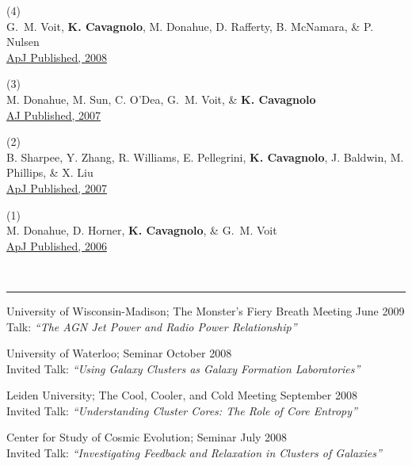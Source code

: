 \documentclass[12pt]{cv}
\newcommand{\myhead}{Cavagnolo, Curriculum Vitae}
\begin{document}
(4) {}\\
G.~M. Voit, {\bf K. Cavagnolo}, M. Donahue, D. Rafferty, B. McNamara, \& P. Nulsen\\
\href{http://adsabs.harvard.edu/abs/2008ApJ...681L...5V}{ApJ Published, 2008}

(3) {}\\
M. Donahue, M. Sun, C. O'Dea, G.~M. Voit, \& {\bf K. Cavagnolo}\\
\href{http://adsabs.harvard.edu/abs/2007AJ....134...14D}{AJ Published, 2007}

(2) {}\\
B. Sharpee, Y. Zhang, R. Williams, E. Pellegrini, {\bf K. Cavagnolo}, J. Baldwin, M. Phillips, \& X. Liu\\
\href{http://adsabs.harvard.edu/abs/2007ApJ...659.1265S}{ApJ Published, 2007}

(1) {}\\
M. Donahue, D. Horner, {\bf K. Cavagnolo}, \& G.~M. Voit\\
\href{http://adsabs.harvard.edu/abs/2006ApJ...643..730D}{ApJ Published, 2006}

\markright{\myhead}
{\large{}}\vspace{-0.3cm}\\
\rule{\linewidth}{0.5pt}
University of Wisconsin-Madison; The Monster's Fiery Breath Meeting \hfill June 2009\\
Talk: {\textit{``The AGN Jet Power and Radio Power Relationship''}}

University of Waterloo; Seminar \hfill October 2008\\
Invited Talk: {\textit{``Using Galaxy Clusters as Galaxy Formation Laboratories''}}

Leiden University; The Cool, Cooler, and Cold Meeting \hfill September 2008\\
Invited Talk: {\textit{``Understanding Cluster Cores: The Role of Core Entropy''}}
 
Center for Study of Cosmic Evolution; Seminar \hfill July 2008\\
Invited Talk: {\textit{``Investigating Feedback and Relaxation in Clusters of Galaxies''}}
\end{document}
